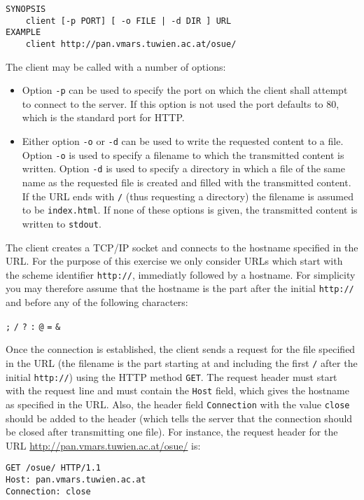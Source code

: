 \begin{verbatim}
SYNOPSIS
    client [-p PORT] [ -o FILE | -d DIR ] URL
EXAMPLE
    client http://pan.vmars.tuwien.ac.at/osue/
\end{verbatim}

The client may be called with a number of options:
\begin{itemize}
\item Option \texttt{-p} can be used to specify the port
on which the client shall attempt to connect to the server.
If this option is not used the port defaults to 80,
which is the standard port for HTTP.
\item Either option \texttt{-o} or \texttt{-d} can be used
to write the requested content to a file.
Option \texttt{-o} is used to specify a filename
to which the transmitted content is written.
Option \texttt{-d} is used to specify a directory
in which a file of the same name as the requested file is created
and filled with the transmitted content.
If the URL ends with \verb|/| (thus requesting a directory)
the filename is assumed to be \verb|index.html|.
If none of these options is given,
the transmitted content is written to \verb|stdout|.
\end{itemize}

The client creates a TCP/IP socket
and connects to the hostname specified in the URL.
For the purpose of this exercise we only consider URLs
which start with the scheme identifier \verb|http://|,
immediatly followed by a hostname.
For simplicity you may therefore assume that
the hostname is the part after the initial \verb|http://|
and before any of the following characters:

\texttt{;} \texttt{/} \texttt{?} \texttt{:} \texttt{@} \texttt{=} \texttt{\&}

Once the connection is established,
the client sends a request for the file specified in the URL
(the filename is the part starting at and including the first \texttt{/}
after the initial \verb|http://|)
using the HTTP method \texttt{GET}.
The request header must start with the request line
and must contain the \texttt{Host} field,
which gives the hostname as specified in the URL.
Also, the header field \verb|Connection| with the value \verb|close|
should be added to the header
(which tells the server that the connection should be closed after transmitting one file).
For instance, the request header for the URL
\url{http://pan.vmars.tuwien.ac.at/osue/} is:

\begin{verbatim}
GET /osue/ HTTP/1.1
Host: pan.vmars.tuwien.ac.at
Connection: close
\end{verbatim}

